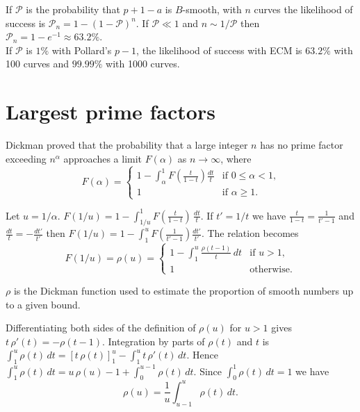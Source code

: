 \documentclass[a4paper, 11pt, pdftex]{report}
\theoremstyle{plain}
\theoremstyle{definition}
\begin{document}
If $\mathcal{P}$ is the probability that $p + 1 - a$ is $B$-smooth, with $n$ curves
the likelihood of success is $\mathcal{P}_n = 1 - (1 - \mathcal{P})^n$. If $\mathcal{P} \ll 1$
and $n \sim 1/\mathcal{P}$ then $\mathcal{P}_n = 1 - e^{-1} \approx 63.2\% $.\\
If $\mathcal{P}$ is $1\%$ with Pollard's $p - 1$, the likelihood of success with ECM
is $63.2\% $ with 100 curves and $99.99\% $ with 1000 curves.

\section{Largest prime factors}

Dickman \cite{Dickman1} proved that the probability that a large integer $n$ has no prime factor
exceeding $n^\alpha$ approaches a limit $F(\alpha)$ as $n \to \infty$, where
\begin{equation*}
F(\alpha) = \begin{cases}
1 - \int_\alpha^1 F(\frac{t}{1-t}) \frac{dt}{t} & \text{if } 0 \leq \alpha < 1 \text{,}\\
1& \text{if } \alpha \geq 1 \text{.}
\end{cases}
\end{equation*}

Let $u = 1/\alpha$. $F(1/u) = 1 - \int_{1/u}^1 F(\frac{t}{1-t})\, \frac{dt}{t}$.
If $t' = 1/t$ we have $\frac{t}{1-t} = \frac{1}{t' - 1}$ and $\frac{dt}{t} = -\frac{dt'}{t'}$
then $F(1/u) = 1 - \int_1^u F(\frac{1}{t' - 1}) \frac{dt'}{t'}$. The relation becomes
\begin{equation*}
F(1/u) = \rho(u) = \begin{cases}
1 - \int_1^u \frac{\rho(t - 1)}{t}\, dt & \text{if } u > 1 \text{,}\\
1 & \text{otherwise.}
\end{cases}
\end{equation*}

$\rho$ is the Dickman function used to estimate the proportion of smooth numbers up to a given bound.

Differentiating both sides of the definition of $\rho(u)$ for $u > 1$ gives
$t\, \rho'(t) = -\rho(t - 1)$. Integration by parts of $\rho(t)$ and $t$ is
$\int_1^u \rho(t)\, dt = \left[ t\, \rho(t) \right]_1^u - \int_1^u t\, \rho'(t)\, dt$. Hence
$\int_1^u \rho(t)\, dt = u\, \rho(u) - 1 + \int_0^{u-1} \rho(t) \, dt$. Since
$\int_0^1 \rho(t) \, dt = 1$ we have
$$\rho(u) = \frac{1}{u} \int_{u - 1}^u \rho(t)\, dt.$$
\end{document}
